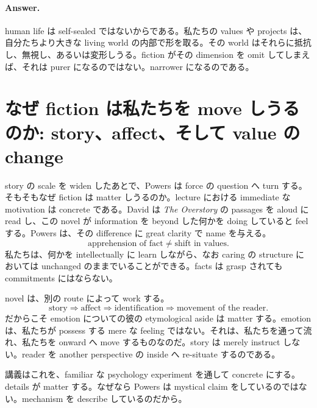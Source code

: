 \paragraph{Answer.} human life は self-sealed ではないからである。私たちの values や projects は、自分たちより大きな living world の内部で形を取る。その world はそれらに抵抗し、無視し、あるいは変形しうる。fiction がその dimension を omit してしまえば、それは purer になるのではない。narrower になるのである。

\section{なぜ fiction は私たちを move しうるのか: story、affect、そして value の change}

story の scale を widen したあとで、Powers は force の question へ turn する。そもそもなぜ fiction は matter しうるのか。lecture における immediate な motivation は concrete である。David は \emph{The Overstory} の passages を aloud に read し、この novel が information を beyond した何かを doing していると feel する。Powers は、その difference に great clarity で name を与える。
\begin{equation}
\text{apprehension of fact} \neq \text{shift in values}.
\end{equation}
私たちは、何かを intellectually に learn しながら、なお caring の structure においては unchanged のままでいることができる。facts は grasp されても commitments にはならない。

novel は、別の route によって work する。
\begin{equation}
\text{story} \Rightarrow \text{affect} \Rightarrow \text{identification} \Rightarrow \text{movement of the reader}.
\end{equation}
だからこそ emotion についての彼の etymological aside は matter する。emotion は、私たちが possess する mere な feeling ではない。それは、私たちを通って流れ、私たちを onward へ move するものなのだ。story は merely instruct しない。reader を another perspective の inside へ re-situate するのである。

講義はこれを、familiar な psychology experiment を通して concrete にする。details が matter する。なぜなら Powers は mystical claim をしているのではない。mechanism を describe しているのだから。


